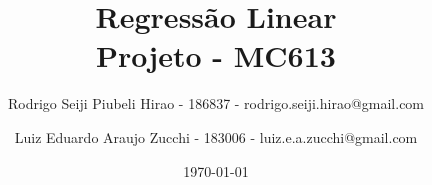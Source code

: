 \title{%
Regressão Linear \\
\large Projeto - MC613
}
\author{
    Rodrigo Seiji Piubeli Hirao - 186837 - rodrigo.seiji.hirao@gmail.com
    \and
    Luiz Eduardo Araujo Zucchi - 183006 - luiz.e.a.zucchi@gmail.com
}
\date{\today}


